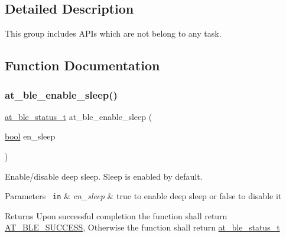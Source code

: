\subsection{Detailed Description}
This group includes A\+P\+Is which are not belong to any task. 



\subsection{Function Documentation}
\mbox{\label{group__misc__group_gaba8b09c4f8f3b40e4eb84a38187b1f58}} 
\subsubsection{\texorpdfstring{at\_ble\_enable\_sleep()}{at\_ble\_enable\_sleep()}}
{\footnotesize\ttfamily \mbox{\hyperlink{group__error__codes__group_ga3b1db9b95feb157b3c188ca27fe76988}{at\+\_\+ble\+\_\+status\+\_\+t}} at\+\_\+ble\+\_\+enable\+\_\+sleep (\begin{DoxyParamCaption}\item[{\mbox{\hyperlink{group__group__sam0__utils_ga97a80ca1602ebf2303258971a2c938e2}{bool}}}]{en\+\_\+sleep }\end{DoxyParamCaption})}



Enable/disable deep sleep. Sleep is enabled by default. 


\begin{DoxyParams}[1]{Parameters}
\mbox{\texttt{ in}}  & {\em en\+\_\+sleep} & true to enable deep sleep or false to disable it\\
\hline
\end{DoxyParams}
\begin{DoxyReturn}{Returns}
Upon successful completion the function shall return \mbox{\hyperlink{group__error__codes__group_gga3b1db9b95feb157b3c188ca27fe76988a7e3bfff5387331cd4f2c56cbcbbd7e19}{A\+T\+\_\+\+B\+L\+E\+\_\+\+S\+U\+C\+C\+E\+SS}}, Otherwise the function shall return \mbox{\hyperlink{at__ble__api_8h_ace24eb4e5ca3f325c663b809da5feb92}{at\+\_\+ble\+\_\+status\+\_\+t}} 
\end{DoxyReturn}
\mbox{\label{group__misc__group_ga80845db83e539aacd58d93f598805c64}} 

